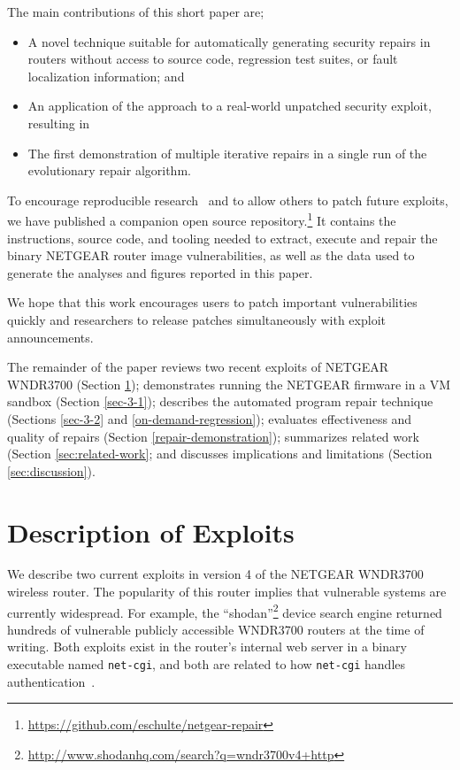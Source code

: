 \documentclass{sigcomm-alternate}
\begin{document}
The main  contributions of this short paper are;
\begin{itemize}
\item A novel technique suitable for automatically generating security
  repairs in routers without access to source code, regression test suites, or fault
localization information; and
\item An application of the approach to a real-world unpatched
security exploit, resulting in
\item The first demonstration of multiple iterative repairs in a single
run of the evolutionary repair algorithm.
\end{itemize}

To encourage reproducible
research~\cite{buckheit1995wavelab,mesirov2010accessible} and to allow
others to patch
future exploits, we have published a companion open source
repository.\footnote{\url{https://github.com/eschulte/netgear-repair}}
It contains the instructions, source
code, and tooling needed to extract, execute and repair the binary
NETGEAR router image vulnerabilities, as well as the data used to
generate the
analyses and figures reported  in this paper.

We hope that this work encourages users to patch important
vulnerabilities quickly and researchers to release patches
simultaneously with exploit announcements.

The remainder of the paper reviews two recent exploits of NETGEAR
WNDR3700 (Section \ref{sec-2}); demonstrates %
running the NETGEAR firmware in a VM sandbox (Section \ref{sec-3-1});
describes the automated program repair technique (Sections
\ref{sec-3-2} and \ref{on-demand-regression}); evaluates effectiveness
and quality of repairs (Section \ref{repair-demonstration}); summarizes
related work (Section \ref{sec:related-work}; and discusses
implications and limitations (Section \ref{sec:discussion}).


\section{Description of Exploits}
\label{sec-2}
We describe two current exploits in version 4 of the NETGEAR WNDR3700
wireless router. The popularity of this router implies that vulnerable
systems are currently widespread. For example, the
``shodan''\footnote{\url{http://www.shodanhq.com/search?q=wndr3700v4+http}}
device search engine returned hundreds of vulnerable publicly
accessible WNDR3700 routers at the time of writing.  Both exploits
exist in the router's internal web server in a binary executable named
\texttt{net-cgi}, and both are related to how \texttt{net-cgi} handles
authentication~\cite{zcutlip}.
\end{document}

